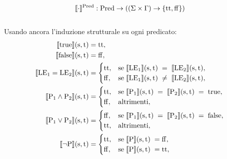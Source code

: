 \documentclass[a4paper, 12pt, oneside,fleqn]{book}
\begin{document}
$$\llbracket \cdot \rrbracket ^{\mathrm{Pred}}: \mathrm{Pred} \rightarrow ((\Sigma \times \Gamma) \rightarrow \{\mathrm{tt},\mathrm{ff} \})$$\\
Usando ancora l'induzione strutturale su ogni predicato:
\begin{align}
\llbracket \mathrm{true} \rrbracket(\mathrm{s},\mathrm{t}) &= \mathrm{tt}, \\
\llbracket \mathrm{false} \rrbracket(\mathrm{s},\mathrm{t}) &= \mathrm{ff}, \\
\llbracket \mathrm{LE}{_1} = \mathrm{LE}{_2}\rrbracket(\mathrm{s},\mathrm{t}) &=
        \begin{cases}
                \mathrm{tt}, &\text{se} \hspace{1mm}\llbracket\mathrm{LE}{_1}\rrbracket(\mathrm{s},\mathrm{t})\hspace{1mm} = \hspace{1mm}\llbracket                                          \mathrm{LE}{_2} \rrbracket(\mathrm{s},\mathrm{t}),\\
                \mathrm{ff}, &\text{se}\hspace{1mm}\llbracket\mathrm{LE}{_1}\rrbracket(\mathrm{s},\mathrm{t})\hspace{1mm}\neq\hspace{1mm}\llbracket                                          \mathrm{LE}{_2}\rrbracket(\mathrm{s},\mathrm{t}),
        \end{cases} \\
\llbracket \mathrm{P}{_1} \wedge \mathrm{P}{_2}\rrbracket(\mathrm{s},\mathrm{t}) &=
        \begin{cases}
                \mathrm{tt}, &\text{se}\hspace{1mm}\llbracket \mathrm{P}{_1}\rrbracket(\mathrm{s},\mathrm{t})\hspace{1mm} = \hspace{1mm}\llbracket                                           \mathrm{P}{_2}\rrbracket(\mathrm{s},\mathrm{t})\hspace{1mm} = \hspace{1mm}\mathrm{true},\\
                \mathrm{ff}, &\text{altrimenti},
        \end{cases} \\
\llbracket \mathrm{P}{_1} \vee \mathrm{P}{_2}\rrbracket(\mathrm{s},\mathrm{t}) &=
        \begin{cases}
                \mathrm{ff}, &\text{se} \hspace{1mm}\llbracket \mathrm{P}{_1}\rrbracket(\mathrm{s},\mathrm{t})\hspace{1mm} = \hspace{1mm}\llbracket                                          \mathrm{P}{_2}\rrbracket(\mathrm{s},\mathrm{t})\hspace{1mm} = \hspace{1mm}\mathrm{false},   \\
                \mathrm{tt},  &\text{altrimenti},
        \end{cases} \\
\llbracket \neg \mathrm{P}\rrbracket(\mathrm{s},\mathrm{t}) &=
        \begin{cases}
                \mathrm{tt},&\text{se}\hspace{1mm}\llbracket \mathrm{P}\rrbracket(\mathrm{s},\mathrm{t})\hspace{1mm} = \mathrm{ff},\\
                \mathrm{ff},&\text{se}\hspace{1mm} \llbracket \mathrm{P}\rrbracket(\mathrm{s},\mathrm{t})\hspace{1mm} = \mathrm{tt},
        \end{cases}
\end{align}
\end{document}
